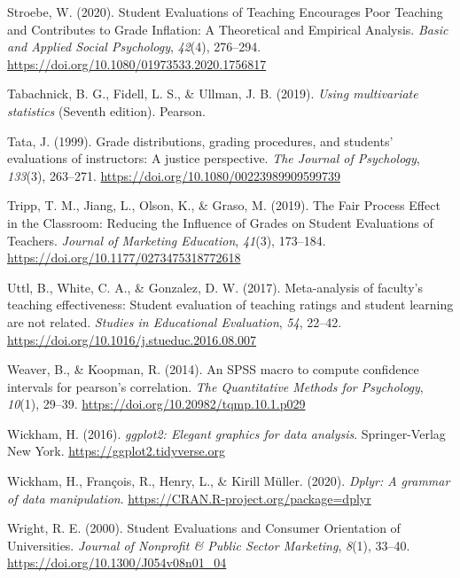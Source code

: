 \documentclass[
  man]{apa7}
\newlength{\cslhangindent}
\newlength{\cslentryspacingunit} %
\newenvironment{CSLReferences}[2] %
 {%
  \setlength{\parindent}{0pt}
  \ifodd #1
  \let\oldpar\par
  \def\par{\hangindent=\cslhangindent\oldpar}
  \fi
  \setlength{\parskip}{#2\cslentryspacingunit}
 }%
 {}
\begin{document}
\begin{CSLReferences}{1}{0}
\leavevmode{}%
Stroebe, W. (2020). Student Evaluations of Teaching Encourages Poor Teaching and Contributes to Grade Inflation: A Theoretical and Empirical Analysis. \emph{Basic and Applied Social Psychology}, \emph{42}(4), 276--294. \url{https://doi.org/10.1080/01973533.2020.1756817}

\leavevmode{}%
Tabachnick, B. G., Fidell, L. S., \& Ullman, J. B. (2019). \emph{Using multivariate statistics} (Seventh edition). Pearson.

\leavevmode{}%
Tata, J. (1999). Grade distributions, grading procedures, and students' evaluations of instructors: A justice perspective. \emph{The Journal of Psychology}, \emph{133}(3), 263--271. \url{https://doi.org/10.1080/00223989909599739}

\leavevmode{}%
Tripp, T. M., Jiang, L., Olson, K., \& Graso, M. (2019). The Fair Process Effect in the Classroom: Reducing the Influence of Grades on Student Evaluations of Teachers. \emph{Journal of Marketing Education}, \emph{41}(3), 173--184. \url{https://doi.org/10.1177/0273475318772618}

\leavevmode{}%
Uttl, B., White, C. A., \& Gonzalez, D. W. (2017). Meta-analysis of faculty's teaching effectiveness: Student evaluation of teaching ratings and student learning are not related. \emph{Studies in Educational Evaluation}, \emph{54}, 22--42. \url{https://doi.org/10.1016/j.stueduc.2016.08.007}

\leavevmode{}%
Weaver, B., \& Koopman, R. (2014). An SPSS macro to compute confidence intervals for pearson{'}s correlation. \emph{The Quantitative Methods for Psychology}, \emph{10}(1), 29--39. \url{https://doi.org/10.20982/tqmp.10.1.p029}

\leavevmode{}%
Wickham, H. (2016). \emph{ggplot2: Elegant graphics for data analysis}. Springer-Verlag New York. \url{https://ggplot2.tidyverse.org}

\leavevmode{}%
Wickham, H., François, R., Henry, L., \& Kirill Müller. (2020). \emph{Dplyr: A grammar of data manipulation}. \url{https://CRAN.R-project.org/package=dplyr}

\leavevmode{}%
Wright, R. E. (2000). Student Evaluations and Consumer Orientation of Universities. \emph{Journal of Nonprofit \& Public Sector Marketing}, \emph{8}(1), 33--40. \url{https://doi.org/10.1300/J054v08n01_04}


\end{CSLReferences}
\end{document}
